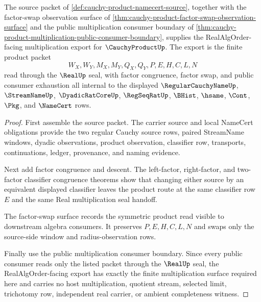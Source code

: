 \begin{theorem}
\label{thm:cauchy-product-realalgorder-multiplication-export}
The source packet of \autoref{def:cauchy-product-namecert-source}, together with the factor-swap observation surface of \autoref{thm:cauchy-product-factor-swap-observation-surface} and the public multiplication consumer boundary of \autoref{thm:cauchy-product-multiplication-public-consumer-boundary}, supplies the RealAlgOrder-facing multiplication export for $\CauchyProductUp$. The export is the finite product packet
$$
W_X,W_Y,M_X,M_Y,Q_X,Q_Y,P,E,H,C,L,N
$$
read through the $\RealUp$ seal, with factor congruence, factor swap, and public consumer exhaustion all internal to the displayed $\RegularCauchyNameUp$, $\StreamNameUp$, $\DyadicRatCoreUp$, $\RegSeqRatUp$, $\BHist$, $\hsame$, $\Cont$, $\Pkg$, and $\NameCert$ rows.
\end{theorem}
\begin{proof}
First assemble the source packet. The carrier source and local NameCert obligations provide the two regular Cauchy source rows, paired StreamName windows, dyadic observations, product observation, classifier row, transports, continuations, ledger, provenance, and naming evidence.

Next add factor congruence and descent. The left-factor, right-factor, and two-factor classifier congruence theorems show that changing either source by an equivalent displayed classifier leaves the product route at the same classifier row $E$ and the same Real multiplication seal handoff.

The factor-swap surface records the symmetric product read visible to downstream algebra consumers. It preserves $P,E,H,C,L,N$ and swaps only the source-side window and radius-observation rows.

Finally use the public multiplication consumer boundary. Since every public consumer reads only the listed packet through the $\RealUp$ seal, the RealAlgOrder-facing export has exactly the finite multiplication surface required here and carries no host multiplication, quotient stream, selected limit, trichotomy row, independent real carrier, or ambient completeness witness.
\end{proof}

